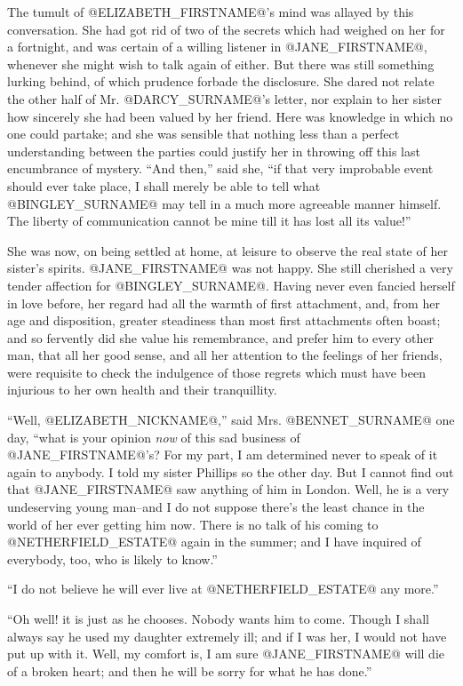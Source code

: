 The tumult of @ELIZABETH_FIRSTNAME@'s mind was allayed by this conversation. She had
got rid of two of the secrets which had weighed on her for a fortnight,
and was certain of a willing listener in @JANE_FIRSTNAME@, whenever she might wish
to talk again of either. But there was still something lurking behind,
of which prudence forbade the disclosure. She dared not relate the other
half of Mr. @DARCY_SURNAME@'s letter, nor explain to her sister how sincerely she
had been valued by her friend. Here was knowledge in which no one
could partake; and she was sensible that nothing less than a perfect
understanding between the parties could justify her in throwing off
this last encumbrance of mystery. ``And then,'' said she, ``if that very
improbable event should ever take place, I shall merely be able to
tell what @BINGLEY_SURNAME@ may tell in a much more agreeable manner himself. The
liberty of communication cannot be mine till it has lost all its value!''

She was now, on being settled at home, at leisure to observe the real
state of her sister's spirits. @JANE_FIRSTNAME@ was not happy. She still cherished a
very tender affection for @BINGLEY_SURNAME@. Having never even fancied herself
in love before, her regard had all the warmth of first attachment,
and, from her age and disposition, greater steadiness than most first
attachments often boast; and so fervently did she value his remembrance,
and prefer him to every other man, that all her good sense, and all her
attention to the feelings of her friends, were requisite to check the
indulgence of those regrets which must have been injurious to her own
health and their tranquillity.

``Well, @ELIZABETH_NICKNAME@,'' said Mrs. @BENNET_SURNAME@ one day, ``what is your opinion \textit{now} of
this sad business of @JANE_FIRSTNAME@'s? For my part, I am determined never to speak
of it again to anybody. I told my sister Phillips so the other day. But
I cannot find out that @JANE_FIRSTNAME@ saw anything of him in London. Well, he is
a very undeserving young man--and I do not suppose there's the least
chance in the world of her ever getting him now. There is no talk of
his coming to @NETHERFIELD_ESTATE@ again in the summer; and I have inquired of
everybody, too, who is likely to know.''

``I do not believe he will ever live at @NETHERFIELD_ESTATE@ any more.''

``Oh well! it is just as he chooses. Nobody wants him to come. Though I
shall always say he used my daughter extremely ill; and if I was her, I
would not have put up with it. Well, my comfort is, I am sure @JANE_FIRSTNAME@ will
die of a broken heart; and then he will be sorry for what he has done.''

